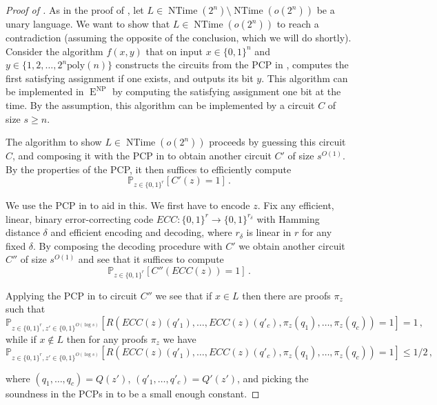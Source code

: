 \documentclass{toc}
\DeclareMathOperator{\NTime}{\mathrm{NTime}}  %
\DeclareMathOperator{\NP}{\mathrm{NP}}  %
\DeclareMathOperator{\EEE}{\mathrm{E}}  %
\newcommand{\zo}{\{0, 1\}}
\renewcommand{\P}{\mathbb{P}}
\newcommand{\poly}{\mathrm{poly}}
\begin{document}
\begin{proof}[Proof of ]
As in the
proof of ,
let $L\in\mathrm{\NTime}(2^{n})\setminus\mathrm{\NTime}(o(2^{n}))$
\cite{Cook73,SeiferasFM78,Zak83} be a unary language. We want to
show that $L\in\mathrm{\NTime}(o(2^{n}))$ to reach a contradiction
(assuming the opposite of the conclusion, which we will do shortly).
Consider the algorithm $f(x,y)$ that on input $x\in\zo^{n}$ and
$y\in\{1,2,\ldots,2^{n}\poly(n)\}$ constructs the circuits from the
PCP in , computes the first satisfying assignment
if one exists, and outputs its bit $y$. This algorithm can be implemented
in $\EEE^{\NP}$ by computing the satisfying assignment one bit at the
time. By the assumption, this algorithm can be implemented by a circuit
$C$ of size $s\ge n$.

The algorithm to show %
$L\in \mathrm{\NTime}(o(2^{n}))$   %
proceeds by guessing
this circuit $C$, and composing it with the PCP in 
to obtain another circuit $C'$ of size $s^{O(1)}$. By the properties
of the PCP, it then suffices to efficiently compute
\[
\P_{z\in\zo^{r}}[C'(z)=1]\,.
\]

We use the PCP in  to aid in this. We first
have to encode $z$. Fix any efficient, linear, binary error-correcting
code $ECC:\zo^{r}\to\zo^{r_{\delta}}$ with Hamming distance $\delta$
and efficient encoding and decoding, where $r_{\delta}$ is linear
in $r$ for any fixed $\delta$. By composing the decoding procedure
with $C'$ we obtain another circuit $C''$ of size $s^{O(1)}$ and
see that it suffices to compute
\[
\P_{z\in\zo^{r}}[C''(ECC(z))=1]\,.
\]

Applying the PCP in  to circuit $C''$
we see that if $x\in L$ then there are proofs $\pi_{z}$ such that
\[
\P_{z\in\zo^{r},z'\in\zo^{O(\log s)}}[R(ECC(z)(q'_{1}),\ldots,ECC(z)(q'_{c}),\pi_{z}(q_{1}),\ldots,\pi_{z}(q_{c}))=1]=1\,,
\]
while if $x\not\in L$ then for any proofs $\pi_{z}$ we have
\[
\P_{z\in\zo^{r},z'\in\zo^{O(\log s)}}[R(ECC(z)(q'_{1}),\ldots,ECC(z)(q'_{c}),\pi_{z}(q_{1}),\ldots,\pi_{z}(q_{c}))=1]\le1/2\,,
\]

where $(q_{1},\ldots,q_{c})=Q(z')$, $(q'_{1},\ldots,q'_{c})=Q'(z')$,
and picking the soundness in the PCPs in 
 to be a small enough constant.


\end{proof}
\end{document}
